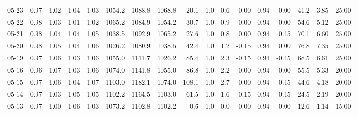 \begin{threeparttable}
{\begin{tabular}{lrrrrrrrrrrrrrrrr}
  05-23 &         0.97 &           1.02 &          1.04 &          1.03 & 1054.2 & 1088.8 & 1068.8 &       20.1 &                      1.0 &                 0.6 &       0.00 &      0.94 &           0.00 &             41.2 &            3.85 &                  25.00 \\
  05-22 &         0.98 &           1.03 &          1.01 &          1.02 & 1065.2 & 1084.9 & 1054.2 &       30.7 &                      1.0 &                 0.9 &       0.00 &      0.94 &           0.00 &             54.6 &            5.12 &                  25.00 \\
  05-21 &         0.98 &           1.04 &          1.04 &          1.05 & 1038.5 & 1092.9 & 1065.2 &       27.6 &                      1.0 &                 0.8 &       0.00 &      0.94 &           0.15 &             70.1 &            6.60 &                  25.00 \\
  05-20 &         0.98 &           1.05 &          1.04 &          1.06 & 1026.2 & 1080.9 & 1038.5 &       42.4 &                      1.0 &                 1.2 &      -0.15 &      0.94 &           0.00 &             76.8 &            7.35 &                  25.00 \\
  05-19 &         0.97 &           1.06 &          1.03 &          1.06 & 1055.0 & 1111.7 & 1026.2 &       85.4 &                      1.0 &                 2.3 &      -0.15 &      0.94 &          -0.15 &             68.5 &            6.61 &                  25.00 \\
  05-16 &         0.96 &           1.07 &          1.03 &          1.06 & 1074.0 & 1141.8 & 1055.0 &       86.8 &                      1.0 &                 2.2 &       0.00 &      0.94 &           0.00 &             55.5 &            5.33 &                  20.00 \\
  05-15 &         0.97 &           1.06 &          1.04 &          1.07 & 1103.0 & 1182.1 & 1074.0 &      108.1 &                      1.0 &                 2.7 &       0.00 &      0.94 &          -0.15 &             44.6 &            4.18 &                  20.00 \\
  05-14 &         0.97 &           1.03 &          1.05 &          1.05 & 1102.2 & 1164.5 & 1103.0 &       61.5 &                      1.0 &                 1.6 &       0.15 &      0.94 &           0.15 &             24.5 &            2.19 &                  20.00 \\
  05-13 &         0.97 &           1.00 &          1.06 &          1.03 & 1073.2 & 1102.8 & 1102.2 &        0.6 &                      1.0 &                 0.0 &       0.00 &      0.94 &           0.00 &             12.6 &            1.14 &                  15.00 \\

\end{tabular}}
\end{threeparttable}
